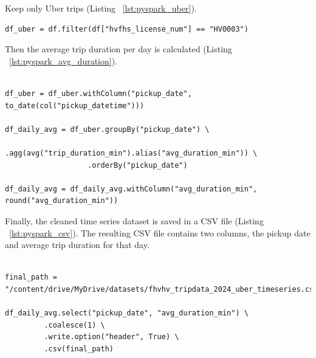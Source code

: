 \documentclass{article}
\begin{document}
Keep only Uber trips (Listing ~\ref{lst:pyspark_uber}).

\begin{lstlisting}[style=pystyle, caption={Filter to Uber trips code}, label={lst:pyspark_uber}]
df_uber = df.filter(df["hvfhs_license_num"] == "HV0003")
\end{lstlisting}

Then the average trip duration per day is calculated (Listing ~\ref{lst:pyspark_avg_duration}).

\begin{lstlisting}[style=pystyle, caption={Calculate average daily duration code}, label={lst:pyspark_avg_duration}]

df_uber = df_uber.withColumn("pickup_date", to_date(col("pickup_datetime")))

df_daily_avg = df_uber.groupBy("pickup_date") \
                   .agg(avg("trip_duration_min").alias("avg_duration_min")) \
                   .orderBy("pickup_date")

df_daily_avg = df_daily_avg.withColumn("avg_duration_min", round("avg_duration_min"))

\end{lstlisting}

Finally, the cleaned time series dataset is saved in a CSV file (Listing ~\ref{lst:pyspark_csv}). The resulting CSV file contains two columns, the pickup date and average trip duration for that day.

\begin{lstlisting}[style=pystyle, caption={Saving time series data code}, label={lst:pyspark_csv}]

final_path = "/content/drive/MyDrive/datasets/fhvhv_tripdata_2024_uber_timeseries.csv"

df_daily_avg.select("pickup_date", "avg_duration_min") \
         .coalesce(1) \
         .write.option("header", True) \
         .csv(final_path)

\end{lstlisting}







\end{document}
